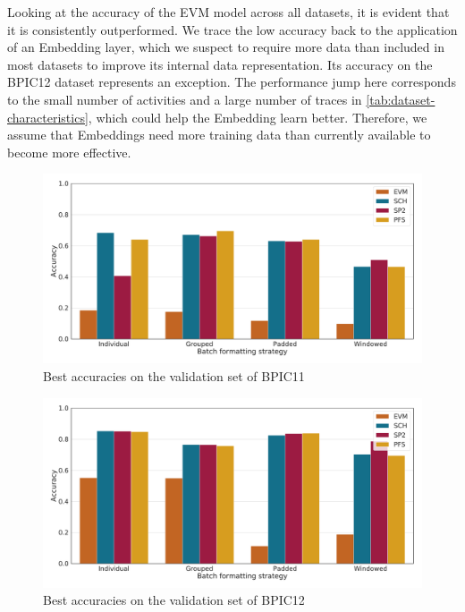 Looking at the accuracy of the EVM model across all datasets, it is evident that it is consistently outperformed. We trace the low accuracy back to the application of an Embedding layer, which we suspect to require more data than included in most datasets to improve its internal data representation.
Its accuracy on the BPIC12 dataset represents an exception. The performance jump here corresponds to the small number of activities and a large number of traces in \autoref{tab:dataset-characteristics}, which could help the Embedding learn better. Therefore, we assume that Embeddings need more training data than currently available to become more effective.

\begin{figure}
    \centering
    \includegraphics[width=\textwidth]{gfx/bpic2011/accuracies.pdf}
    \caption{Best accuracies on the validation set of BPIC11}
    \label{fig:max-accuracies-bpic2011}
\end{figure}
\begin{figure}
    \centering
    \includegraphics[width=\textwidth]{gfx/bpic2012/accuracies.pdf}
    \caption{Best accuracies on the validation set of BPIC12}
    \label{fig:max-accuracies-bpic2012}
\end{figure}
